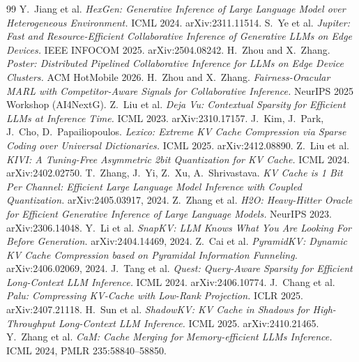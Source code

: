 \documentclass[11pt]{article}
\begin{document}
\begin{thebibliography}{99}
\small
{} Y.~Jiang et al. \emph{HexGen: Generative Inference of Large Language Model over Heterogeneous Environment.} ICML 2024. arXiv:2311.11514.
 S.~Ye et al. \emph{Jupiter: Fast and Resource-Efficient Collaborative Inference of Generative LLMs on Edge Devices.} IEEE INFOCOM 2025. arXiv:2504.08242.
 H.~Zhou and X.~Zhang. \emph{Poster: Distributed Pipelined Collaborative Inference for LLMs on Edge Device Clusters.} ACM HotMobile 2026.
 H.~Zhou and X.~Zhang. \emph{Fairness-Oracular MARL with Competitor-Aware Signals for Collaborative Inference.} NeurIPS 2025 Workshop (AI4NextG).
 Z.~Liu et al. \emph{Deja Vu: Contextual Sparsity for Efficient LLMs at Inference Time.} ICML 2023. arXiv:2310.17157.
 J.~Kim, J.~Park, J.~Cho, D.~Papailiopoulos. \emph{Lexico: Extreme KV Cache Compression via Sparse Coding over Universal Dictionaries.} ICML 2025. arXiv:2412.08890.
 Z.~Liu et al. \emph{KIVI: A Tuning-Free Asymmetric 2bit Quantization for KV Cache.} ICML 2024. arXiv:2402.02750.
 T.~Zhang, J.~Yi, Z.~Xu, A.~Shrivastava. \emph{KV Cache is 1 Bit Per Channel: Efficient Large Language Model Inference with Coupled Quantization.} arXiv:2405.03917, 2024.
 Z.~Zhang et al. \emph{H2O: Heavy-Hitter Oracle for Efficient Generative Inference of Large Language Models.} NeurIPS 2023. arXiv:2306.14048.
 Y.~Li et al. \emph{SnapKV: LLM Knows What You Are Looking For Before Generation.} arXiv:2404.14469, 2024.
 Z.~Cai et al. \emph{PyramidKV: Dynamic KV Cache Compression based on Pyramidal Information Funneling.} arXiv:2406.02069, 2024.
 J.~Tang et al. \emph{Quest: Query-Aware Sparsity for Efficient Long-Context LLM Inference.} ICML 2024. arXiv:2406.10774.
 J.~Chang et al. \emph{Palu: Compressing KV-Cache with Low-Rank Projection.} ICLR 2025. arXiv:2407.21118.
 H.~Sun et al. \emph{ShadowKV: KV Cache in Shadows for High-Throughput Long-Context LLM Inference.} ICML 2025. arXiv:2410.21465.
 Y.~Zhang et al. \emph{CaM: Cache Merging for Memory-efficient LLMs Inference.} ICML 2024, PMLR 235:58840--58850.
\end{thebibliography}
\end{document}

